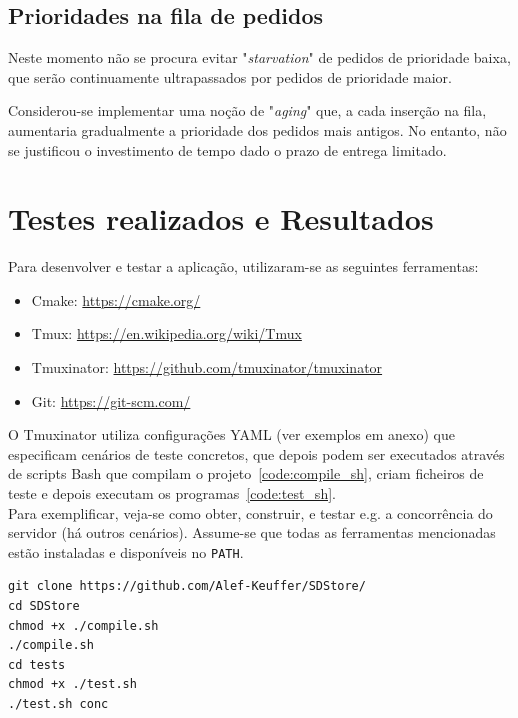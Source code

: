 \documentclass[11pt,a4paper]{report}%
\begin{document}
\section{Prioridades na fila de pedidos}

Neste momento não se procura evitar "\textit{starvation}" de pedidos de prioridade baixa, que serão continuamente
ultrapassados por pedidos de prioridade maior.

Considerou-se implementar uma noção de "\textit{aging}" que, a cada inserção na fila, aumentaria gradualmente
a prioridade dos pedidos mais antigos. No entanto, não se justificou o investimento de tempo dado o prazo
de entrega limitado.

{\let\clearpage\relax \chapter{Testes realizados e Resultados} \label{chap:bash_testes} } %

Para desenvolver e testar a aplicação, utilizaram-se as seguintes ferramentas:

\begin{itemize}
  \item Cmake: \url{https://cmake.org/}
  \item Tmux: \url{https://en.wikipedia.org/wiki/Tmux}
  \item Tmuxinator: \url{https://github.com/tmuxinator/tmuxinator}
  \item Git: \url{https://git-scm.com/}
\end{itemize}

O Tmuxinator utiliza configurações YAML (ver exemplos em anexo) que especificam cenários
de teste concretos, que depois podem ser executados através de scripts Bash que compilam
o projeto~\ref{code:compile_sh}, criam ficheiros de teste e depois executam os programas~\ref{code:test_sh}.\\

Para exemplificar, veja-se como obter, construir, e testar e.g. a concorrência do servidor (há outros cenários).
Assume-se que todas as ferramentas mencionadas estão instaladas e disponíveis no \texttt{PATH}.

\begin{lstlisting}
git clone https://github.com/Alef-Keuffer/SDStore/
cd SDStore
chmod +x ./compile.sh
./compile.sh
cd tests
chmod +x ./test.sh
./test.sh conc
\end{lstlisting}
\end{document}
